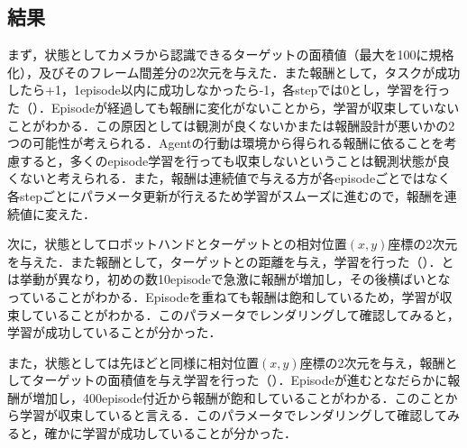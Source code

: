 \subsection{結果}
まず，状態としてカメラから認識できるターゲットの面積値（最大を100に規格化），及びそのフレーム間差分の2次元を与えた．また報酬として，タスクが成功したら+1，1episode以内に成功しなかったら-1，各stepでは0とし，学習を行った（）．Episodeが経過しても報酬に変化がないことから，学習が収束していないことがわかる．この原因としては観測が良くないかまたは報酬設計が悪いかの2つの可能性が考えられる．Agentの行動は環境から得られる報酬に依ることを考慮すると，多くのepisode学習を行っても収束しないということは観測状態が良くないと考えられる．また，報酬は連続値で与える方が各episodeごとではなく各stepごとにパラメータ更新が行えるため学習がスムーズに進むので，報酬を連続値に変えた．

次に，状態としてロボットハンドとターゲットとの相対位置$(x,y)$座標の2次元を与えた．また報酬として，ターゲットとの距離を与え，学習を行った（）．とは挙動が異なり，初めの数10episodeで急激に報酬が増加し，その後横ばいとなっていることがわかる．Episodeを重ねても報酬は飽和しているため，学習が収束していることがわかる．このパラメータでレンダリングして確認してみると，学習が成功していることが分かった．

また，状態としては先ほどと同様に相対位置$(x,y)$座標の2次元を与え，報酬としてターゲットの面積値を与え学習を行った（）．Episodeが進むとなだらかに報酬が増加し，400episode付近から報酬が飽和していることがわかる．このことから学習が収束していると言える．このパラメータでレンダリングして確認してみると，確かに学習が成功していることが分かった．

